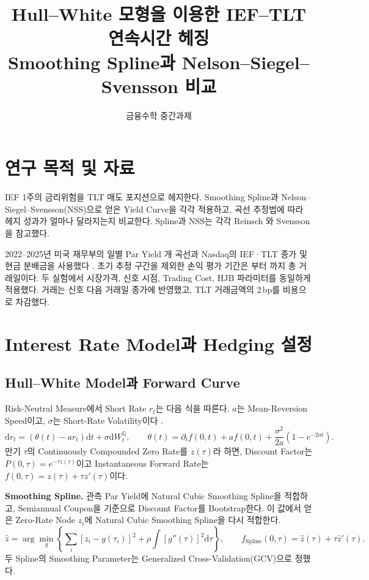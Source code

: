 \documentclass[11pt,a4paper]{article}
\title{\textbf{Hull--White 모형을 이용한 IEF--TLT 연속시간 헤징}\\
\large Smoothing Spline과 Nelson--Siegel--Svensson 비교}
\author{금융수학 중간과제}
\date{}
\newcommand{\dif}{\mathrm d}
\begin{document}
\maketitle

\section{연구 목적 및 자료}

IEF 1주의 금리위험을 TLT 매도 포지션으로 헤지한다. Smoothing Spline과 Nelson--Siegel--Svensson(NSS)으로 얻은 Yield Curve을 각각 적용하고, 곡선 추정법에 따라 헤지 성과가 얼마나 달라지는지 비교한다. Spline과 NSS는 각각 Reinsch \cite{reinsch}와 Svensson \cite{svensson}을 참고했다.

2022--2025년 미국 재무부의 일별 Par Yield \CurveCount{}개 곡선과 Nasdaq의 IEF·TLT 종가 및 현금 분배금을 사용했다 \cite{treasury,ief,tlt}. 초기 추정 구간을 제외한 손익 평가 기간은 \FirstDate{}부터 \LastDate{}까지 총 \SampleSize{}거래일이다. 두 실험에서 시장가격, 신호 시점, Trading Cost, HJB 파라미터를 동일하게 적용했다. 거래는 신호 다음 거래일 종가에 반영했고, TLT 거래금액의 2\,bp를 비용으로 차감했다.

\section{Interest Rate Model과 Hedging 설정}

\subsection{Hull--White Model과 Forward Curve}

Risk-Neutral Measure에서 Short Rate $r_t$는 다음 식을 따른다. $a$는 Mean-Reversion Speed이고, $\sigma$는 Short-Rate Volatility이다 \cite{hw}.
\[
 \dif r_t=(\theta(t)-ar_t)\dif t+\sigma\dif W_t^{\mathbb Q},
 \qquad
 \theta(t)=\partial_t f(0,t)+af(0,t)
              +\frac{\sigma^2}{2a}(1-e^{-2at}).
\]
만기 $\tau$의 Continuously Compounded Zero Rate를 $z(\tau)$라 하면, Discount Factor는 $P(0,\tau)=e^{-\tau z(\tau)}$이고 Instantaneous Forward Rate는 $f(0,\tau)=z(\tau)+\tau z'(\tau)$이다.

\textbf{Smoothing Spline.} 관측 Par Yield에 Natural Cubic Smoothing Spline을 적합하고, Semiannual Coupon을 기준으로 Discount Factor를 Bootstrap한다. 이 값에서 얻은 Zero-Rate Node $z_i$에 Natural Cubic Smoothing Spline을 다시 적합한다.
\[
 \widehat z=\arg\min_g\left\{\sum_i[z_i-g(\tau_i)]^2
                  +\rho\int[g''(\tau)]^2\dif\tau\right\},
 \qquad f_{\mathrm{Spline}}(0,\tau)=\widehat z(\tau)+\tau\widehat z'(\tau).
\]
두 Spline의 Smoothing Parameter는 Generalized Cross-Validation(GCV)으로 정했다.
\end{document}
